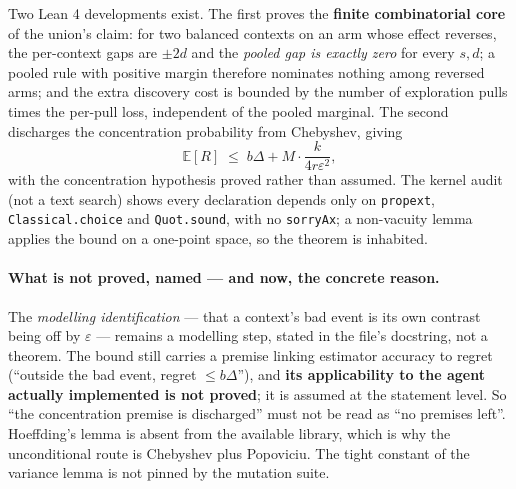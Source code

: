 \documentclass[11pt]{article}
\newcommand{\code}[1]{\texttt{\small #1}}
\begin{document}
Two Lean 4 developments exist. The first proves the \textbf{finite combinatorial core}
of the union's claim: for two balanced contexts on an arm whose effect reverses, the
per-context gaps are $\pm 2d$ and the \emph{pooled gap is exactly zero} for every
$s, d$; a pooled rule with positive margin therefore nominates nothing among reversed
arms; and the extra discovery cost is bounded by the number of exploration pulls times
the per-pull loss, independent of the pooled marginal. The second discharges the
concentration probability from Chebyshev, giving
\[
\mathbb{E}[R] \;\le\; b\Delta + M \cdot \frac{k}{4 r \varepsilon^{2}},
\]
with the concentration hypothesis proved rather than assumed. The kernel audit (not a
text search) shows every declaration depends only on \code{propext},
\code{Classical.choice} and \code{Quot.sound}, with no \code{sorryAx}; a non-vacuity
lemma applies the bound on a one-point space, so the theorem is inhabited.

\paragraph{What is not proved, named --- and now, the concrete reason.} The
\emph{modelling identification} --- that a context's bad event is its own contrast
being off by $\varepsilon$ --- remains a modelling step, stated in the file's
docstring, not a theorem. The bound still carries a premise linking estimator accuracy
to regret (``outside the bad event, regret $\le b\Delta$''), and \textbf{its
applicability to the agent actually implemented is not proved}; it is assumed at the
statement level. So ``the concentration premise is discharged'' must not be read as
``no premises left''. Hoeffding's lemma is absent from the available library, which is
why the unconditional route is Chebyshev plus Popoviciu. The tight constant of the
variance lemma is not pinned by the mutation suite.
\end{document}
